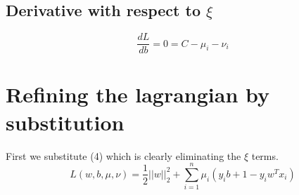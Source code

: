 \documentclass[a4paper,11pt]{article}
\begin{document}
\subsection{Derivative with respect to $\xi$}
  \begin{equation}
    \frac{dL}{db} = 0 = C - \mu_i - \nu_i
  \end{equation}

\section{Refining the lagrangian by substitution}
First we substitute (4) which is clearly eliminating the $\xi$ terms.
\begin{equation}
  L(w, b, \mu, \nu) = \frac{1}{2} ||w||^2_2 + \sum\limits_{i=1}^n {\mu_i(y_ib + 1 - y_iw^Tx_i)}
\end{equation}
\end{document}
